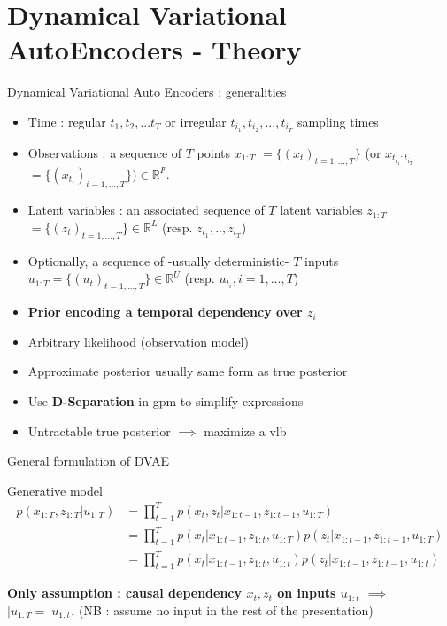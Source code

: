 \section{Dynamical Variational AutoEncoders - Theory}\label{DVAEs}

\begin{frame}{Dynamical Variational Auto Encoders : generalities}
    \begin{itemize}
        \item <1-> Time : regular $t_1, t_2,... t_T$ or irregular $t_{i_1}, t_{i_2},..., t_{i_T}$ sampling times
        \item <1-> Observations : a sequence of $T$ points \textbf{$x_{1:T}$} $= \{(x_t)_{t=1,...,T}\}$ (or \textbf{$x_{t_{i_1}:t_{i_T}}$} $= \{(x_{t_i})_{i=1,...,T}\}) \in \mathbb{R}^F$.
        \item <1-> Latent variables : an associated sequence of $T$ latent variables \textbf{$z_{1:T}$} $= \{(z_t)_{t=1,...,T}\} \in \mathbb{R}^L$ (resp. $z_{t_1},..,z_{t_T}$)
        \item <1-> Optionally, a sequence of -usually deterministic- $T$ inputs $u_{1:T} = \{(u_t)_{t=1,...,T}\} \in \mathbb{R}^U$ (resp. $u_{t_i}, i=1,...,T$)
        \item <2-> \textbf{Prior encoding a temporal dependency over $z_i$}
        \item <2-> Arbitrary likelihood (observation model)
        \item <2-> Approximate posterior usually same form as true posterior
        \item <2-> Use \textbf{D-Separation} in \gls{gpm} to simplify expressions
        \item <2-> Untractable true posterior $\implies$ maximize a \gls{vlb}
    \end{itemize}
\end{frame}

\begin{frame}{General formulation of DVAE}
    \begin{block}{Generative model}
        \begin{align*}
            p(x_{1:T}, z_{1:T} \vert u_{1:T}) &= \prod_{t=1}^T p(x_t, z_t \vert x_{1:t-1}, z_{1:t-1}, u_{1:T}) \\
            &= \prod_{t=1}^T p(x_t \vert x_{1:t-1}, z_{1:t}, u_{1:T}) p(z_t \vert x_{1:t-1}, z_{1:t-1}, u_{1:T}) \\
            &= \prod_{t=1}^T p(x_t \vert x_{1:t-1}, z_{1:t}, u_{1:t}) p(z_t \vert x_{1:t-1}, z_{1:t-1}, u_{1:t})
        \end{align*}
    \end{block}
    \textbf{Only assumption : causal dependency $x_t, z_t$ on inputs $u_{1:t}$ $\implies$ $\vert u_{1:T} = \vert u_{1:t}$.}
    (NB : assume no input in the rest of the presentation)
\end{frame}

